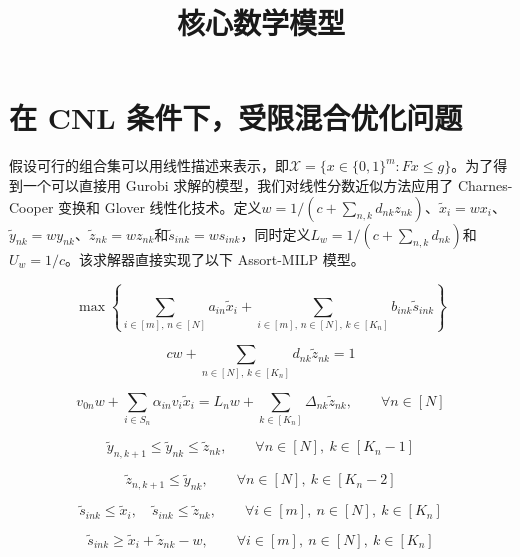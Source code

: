 \documentclass[11pt,a4paper]{article}
\title{核心数学模型}
\date{}
\begin{document}
\maketitle

\section*{在 CNL 条件下，受限混合优化问题}

假设可行的组合集可以用线性描述来表示，即$\mathcal{X} = \{x \in \{0,1\}^m : Fx \le g\}$。为了得到一个可以直接用 Gurobi 求解的模型，我们对线性分数近似方法应用了 Charnes-Cooper 变换和 Glover 线性化技术。定义$w = 1/(c + \sum_{n,k} d_{nk} z_{nk})$、$\tilde{x}_i = w x_i$、$\tilde{y}_{nk} = w y_{nk}$、$\tilde{z}_{nk} = w z_{nk}$和$\tilde{s}_{ink} = w s_{ink}$，同时定义$L_w = 1/(c + \sum_{n,k} d_{nk})$和$U_w = 1/c$。该求解器直接实现了以下 Assort-MILP 模型。


\begin{equation}
\max
\left\{
\sum_{i \in [m],\,n \in [N]} a_{in}\tilde{x}_i
+ \sum_{i \in [m],\,n \in [N],\,k \in [K_n]} b_{ink}\tilde{s}_{ink}
\right\}
\tag{Assort-MILP}
\end{equation}

\begin{equation}
c w + \sum_{n \in [N],\,k \in [K_n]} d_{nk}\tilde{z}_{nk} = 1
\tag{6a}
\end{equation}

\begin{equation}
v_{0n} w + \sum_{i \in S_n} \alpha_{in} v_i \tilde{x}_i
= L_n w + \sum_{k \in [K_n]} \Delta_{nk} \tilde{z}_{nk},
\qquad \forall n \in [N]
\tag{6b}
\end{equation}

\begin{equation}
\tilde{y}_{n,k+1} \le \tilde{y}_{nk} \le \tilde{z}_{nk},
\qquad \forall n \in [N],\ k \in [K_n-1]
\tag{7}
\end{equation}

\begin{equation}
\tilde{z}_{n,k+1} \le \tilde{y}_{nk},
\qquad \forall n \in [N],\ k \in [K_n-2]
\tag{8}
\end{equation}

\begin{equation}
\tilde{s}_{ink} \le \tilde{x}_i,
\quad
\tilde{s}_{ink} \le \tilde{z}_{nk},
\qquad \forall i \in [m],\ n \in [N],\ k \in [K_n]
\tag{9}
\end{equation}

\begin{equation}
\tilde{s}_{ink} \ge \tilde{x}_i + \tilde{z}_{nk} - w,
\qquad \forall i \in [m],\ n \in [N],\ k \in [K_n]
\tag{10}
\end{equation}
\end{document}
